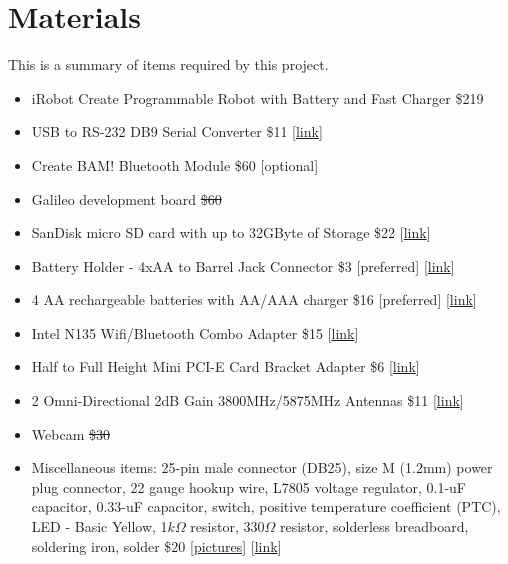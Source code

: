 \documentclass[11pt]{article} %
\begin{document}
\section{Materials}
This is a summary of items required by this project.
\begin{itemize}
\item iRobot Create Programmable Robot with Battery and Fast Charger \$219
\item USB to RS-232 DB9 Serial Converter \$11 [\href{http://www.amazon.com/TRENDnet-RS-232-Serial-Converter-TU-S9/dp/B0007T27H8/ref=sr_1_1?ie=UTF8&qid=1399704271&sr=8-1&keywords=usb+to+rs232}{link}]
\item Create BAM! Bluetooth Module \$60 {[optional]}
\item Galileo development board \sout{\$60}
\item SanDisk micro SD card with up to 32GByte of Storage \$22 [\href{http://www.amazon.com/SanDisk-MicroSDHC-Frustration-Free-Packaging--SDSDQU-032G-AFFP-A/dp/B009QZH7BU/ref=sr_1_1?ie=UTF8&qid=1399754576&sr=8-1&keywords=micro+sd}{link}]
\item Battery Holder - 4xAA to Barrel Jack Connector \$3 [preferred] [\href{https://www.sparkfun.com/products/9835}{link}]
\item 4 AA rechargeable batteries with AA/AAA charger \$16 [preferred] [\href{http://www.amazon.com/Energizer-CHP4WB4-Recharge-Charger-Batteries/dp/B003SP4QAE/ref=sr_1_3?s=hpc&ie=UTF8&qid=1399754201&sr=1-3&keywords=rechargeable+battery}{link}]
\item Intel N135 Wifi/Bluetooth Combo Adapter \$15 [\href{http://www.amazon.com/135BN-HMWWB-Centrino-802-11n-Express-Bluetooth/dp/B007TGPLHK/ref=sr_1_1?s=electronics&ie=UTF8&qid=1391796848&sr=1-1&keywords=Intel+N-135}{link}]
\item Half to Full Height Mini PCI-E Card Bracket Adapter \$6
[\href{http://www.amazon.com/dp/B007VXJ9IS/ref=pe_385040_30332200_pe_309540_26725410_item}{link}]
\item 2 Omni-Directional 2dB Gain 3800MHz/5875MHz Antennas \$11
[\href{http://avnetexpress.avnet.com/store/em/EMController/Antenna/TE-Connectivity-AMP/2118060-1/_/R-13956488/A-13956488/An-0?action=part&catalogId=500201&langId=-1&storeId=500201}{link}]
\item Webcam \sout{\$30}
\item Miscellaneous items: 25-pin male connector (DB25), size M (1.2mm) power plug connector, 22 gauge hookup wire, L7805 voltage regulator, 0.1-uF capacitor, 0.33-uF capacitor, switch, positive temperature coefficient (PTC), LED - Basic Yellow, 1$k\Omega$ resistor, 330$\Omega$ resistor, solderless breadboard, soldering iron, solder \$20 [\href{http://www.instructables.com/id/Voice-Controlled-iRobot-Create/?ALLSTEPS}{pictures}]
[\href{https://www.sparkfun.com/}{link}]
\end{itemize}
\end{document}
